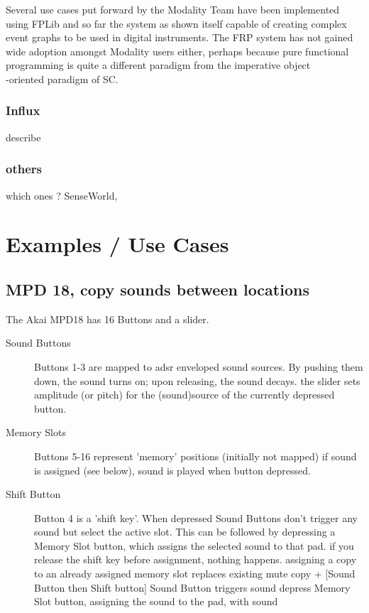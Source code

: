 \documentclass{article}
\begin{document}
Several use cases put forward by the Modality Team have been implemented using FPLib and so far the system as shown itself capable of creating complex event graphs to be used in digital instruments. The FRP system has not gained wide adoption amongst Modality users either, perhaps because pure functional programming is quite a different paradigm from the imperative object\\-oriented paradigm of SC.

\subsubsection{Influx}

describe

\subsubsection{others}

which ones ? SenseWorld, 

\section{Examples / Use Cases}
\label{sec:examples_use_cases}


\subsection{MPD 18, copy sounds between locations}
\label{sub:mpd_18}

The Akai MPD18 has 16 Buttons and a slider. 

\begin{description}
 \item [Sound Buttons] Buttons 1-3 are mapped to adsr enveloped sound sources.
        By pushing them down, the sound turns on; upon releasing, the sound decays.
    the slider sets amplitude (or pitch) for the (sound)source of the currently depressed button.
 \item [Memory Slots] Buttons 5-16 represent 'memory' positions (initially not mapped)
        if sound is assigned (see below), sound is played when button depressed.
 \item [Shift Button] Button 4 is a 'shift key'. When depressed
        Sound Buttons don't trigger any sound but select the active slot. This can be followed by
        depressing a Memory Slot button, which assigns the selected sound to that pad.
        if you release the shift key before assignment, nothing happens.
        assigning a copy to an already assigned memory slot replaces existing
        mute copy + [Sound Button then Shift button]
        Sound Button triggers sound
        depress Memory Slot button, assigning the sound to the pad, with sound
\end{description}
       
\end{document}
